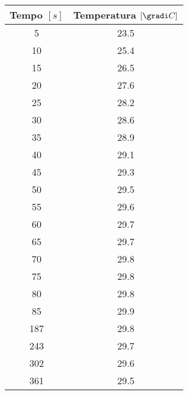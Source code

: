 \begin{tabular}{cc}
\toprule
\multicolumn{1}{c}{Tempo $[s]$} & \multicolumn{1}{c}{Temperatura $[\gradi C]$} \\ \hline
5 & 23.5 \\ \hline
10 & 25.4 \\ \hline
15 & 26.5 \\ \hline
20 & 27.6 \\ \hline
25 & 28.2 \\ \hline
30 & 28.6 \\ \hline
35 & 28.9 \\ \hline
40 & 29.1 \\ \hline
45 & 29.3 \\ \hline
50 & 29.5 \\ \hline
55 & 29.6 \\ \hline
60 & 29.7 \\ \hline
65 & 29.7 \\ \hline
70 & 29.8 \\ \hline
75 & 29.8 \\ \hline
80 & 29.8 \\ \hline
85 & 29.9 \\ \hline
187 & 29.8 \\ \hline
243 & 29.7 \\ \hline
302 & 29.6 \\ \hline
361 & 29.5 \\ 
\bottomrule
\end{tabular}
